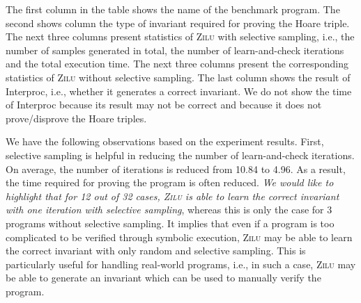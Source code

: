 The first column in the table shows the name of the benchmark program. The second shows column the type of invariant required for proving the Hoare triple. The next three columns present statistics of \textsc{Zilu} with selective sampling, i.e., the number of samples generated in total, the number of learn-and-check iterations and the total execution time. The next three columns present the corresponding statistics of \textsc{Zilu} without selective sampling.
The last column shows the result of Interproc, i.e., whether it generates a correct invariant. We do not show the time of Interproc because its result may not be correct and because it does not prove/disprove the Hoare triples.

We have the following observations based on the experiment results. 
First, selective sampling is helpful in reducing the number of learn-and-check iterations.
On average, the number of iterations is reduced from 10.84 to 4.96. 
As a result, the time required for proving the program is often reduced.
\emph{We would like to highlight that for 12 out of 32 cases, 
\textsc{Zilu} is able to learn the correct invariant with one iteration with selective sampling}, 
whereas this is only the case for 3 programs without selective sampling. 
It implies that even if a program is too complicated to be verified through symbolic execution, 
\textsc{Zilu} may be able to learn the correct invariant with only random and selective sampling.
This is particularly useful for handling real-world programs, i.e., in such a case, \textsc{Zilu} may be able to generate an invariant which can be used to manually verify the program.


